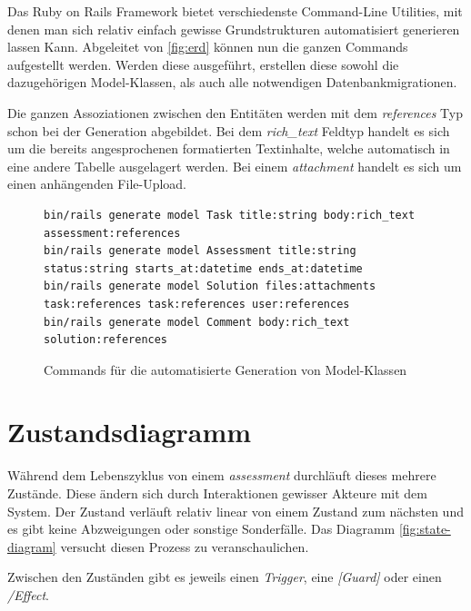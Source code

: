 Das Ruby on Rails Framework bietet verschiedenste Command-Line Utilities, mit denen man sich relativ einfach gewisse
Grundstrukturen automatisiert generieren lassen Kann. Abgeleitet von \ref{fig:erd} können nun die ganzen Commands aufgestellt werden.
Werden diese ausgeführt, erstellen diese sowohl die dazugehörigen Model-Klassen, als auch alle notwendigen Datenbankmigrationen.

Die ganzen Assoziationen zwischen den Entitäten werden mit dem \emph{references} Typ schon bei der Generation abgebildet.
Bei dem \emph{rich\_text} Feldtyp handelt es sich um die bereits angesprochenen formatierten Textinhalte,
welche automatisch in eine andere Tabelle ausgelagert werden. Bei einem \emph{attachment} handelt es sich um einen anhängenden File-Upload.

\begin{figure}[H]
\begin{codebox}[]
\begin{verbatim}
bin/rails generate model Task title:string body:rich_text assessment:references
bin/rails generate model Assessment title:string status:string starts_at:datetime ends_at:datetime
bin/rails generate model Solution files:attachments task:references task:references user:references
bin/rails generate model Comment body:rich_text solution:references 
\end{verbatim}
\end{codebox}
\caption{\label{fig:generate-models}Commands für die automatisierte Generation von Model-Klassen}
\end{figure}

\newpage

\section{Zustandsdiagramm}

Während dem Lebenszyklus von einem \emph{assessment} durchläuft dieses mehrere Zustände. Diese ändern
sich durch Interaktionen gewisser Akteure mit dem System. Der Zustand verläuft relativ linear von einem Zustand zum nächsten und es gibt keine Abzweigungen
oder sonstige Sonderfälle. Das Diagramm \ref{fig:state-diagram} versucht diesen Prozess zu veranschaulichen.

Zwischen den Zuständen gibt es jeweils einen \emph{Trigger}, eine \emph{[Guard]} oder einen \emph{/Effect}.

